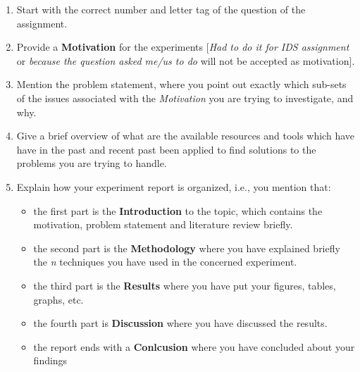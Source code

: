\documentclass[a4paper]{article}
\begin{document}
\begin{enumerate}
 \item Start with the correct number and letter tag of the question of the assignment.
 \item Provide a \textbf{Motivation} for the experiments [\textit{Had to do it for IDS assignment} or \textit{because the question asked me/us to do} will not be accepted as motivation]. 
 \item Mention the problem statement, where you point out exactly which sub-sets of the issues associated with the \textit{Motivation} you are trying to investigate, and why.
 \item Give a brief overview of what are the available resources and tools which have have in the past and recent past been applied to find solutions to the problems you are trying to handle. 
 \item Explain how your experiment report is organized, i.e., you mention that:
 \begin{itemize}
  \item the first part is the \textbf{Introduction} to the topic, which contains the motivation, problem statement and literature review briefly.
  \item the second part is the \textbf{Methodology} where you have explained briefly the \textit{n} techniques you have used in the concerned experiment.
  \item the third part is the \textbf{Results} where you have put your figures, tables, graphs, etc. 
  \item the fourth part is \textbf{Discussion} where you have discussed the results.
  \item the report ends with a \textbf{Conlcusion} where you have concluded about your findings 
 \end{itemize}

\end{enumerate}
\end{document}
